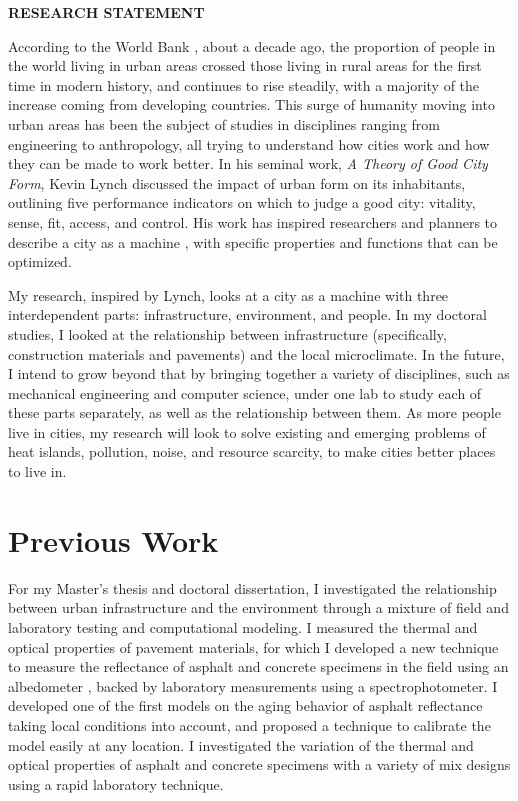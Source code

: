 \documentclass[12pt]{article}
\begin{document}
 \sloppy %

\begin{center}
{\large \uppercase{\textbf{Research Statement}}}
\end{center}

According to the World Bank \cite{Urbanpop19:online}, about a decade ago, the proportion of people in the world living in urban areas crossed those living in rural areas for the first time in modern history, and continues to rise steadily, with a majority of the increase coming from developing countries. This surge of humanity moving into urban areas has been the subject of studies in disciplines ranging from engineering to anthropology, all trying to understand how cities work and how they can be made to work better. In his seminal work, \textit{A Theory of Good City Form}, Kevin Lynch \cite{lynch1984good} discussed the impact of urban form on its inhabitants, outlining five performance indicators on which to judge a good city: vitality, sense, fit, access, and control. His work has inspired researchers and planners to describe a city as a machine \cite{molotch1976city, mcfarlane2011city, lloyd2001city, oke1973city}, with specific properties and functions that can be optimized.

My research, inspired by Lynch, looks at a city as a machine with three interdependent parts: infrastructure, environment, and people. In my doctoral studies, I looked at the relationship between infrastructure (specifically, construction materials and pavements) and the local microclimate. In the future, I intend to grow beyond that by bringing together a variety of disciplines, such as mechanical engineering and computer science, under one lab to study each of these parts separately, as well as the relationship between them. As more people live in cities, my research will look to solve existing and emerging problems of heat islands, pollution, noise, and resource scarcity, to make cities better places to live in.

\section*{Previous Work}
For my Master's thesis and doctoral dissertation, I investigated the relationship between urban infrastructure and the environment through a mixture of field and laboratory testing and computational modeling. I measured the thermal and optical properties of pavement materials, for which I developed a new technique to measure the reflectance of asphalt and concrete specimens in the field using an albedometer \cite{sen2018albedo}, backed by laboratory measurements using a spectrophotometer. I developed one of the first models on the aging behavior of asphalt reflectance \cite{sen2016aging} taking local conditions into account, and proposed a technique to calibrate the model easily at any location. I investigated the variation of the thermal and optical properties of asphalt and concrete specimens with a variety of mix designs using a rapid laboratory technique.
\end{document}
